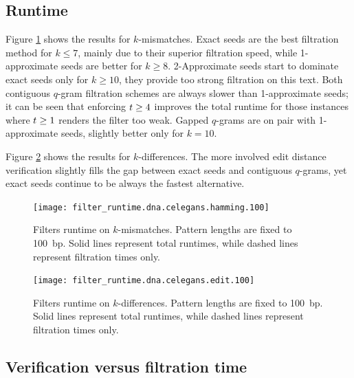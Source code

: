 \subsection{Runtime}

Figure \ref{fig:filter-runtime-hamming-celegans} shows the results for $k$-mismatches.
Exact seeds are the best filtration method for $k \leq 7$, mainly due to their superior filtration speed, while 1-approximate seeds are better for $k \geq 8$.
2-Approximate seeds start to dominate exact seeds only for $k \geq 10$, \ie they provide too strong filtration on this text.
Both contiguous $q$-gram filtration schemes are always slower than 1-approximate seeds;
it can be seen that enforcing $t \geq 4$ improves the total runtime for those instances where $t \geq 1$ renders the filter too weak.
Gapped $q$-grams are on pair with 1-approximate seeds, slightly better only for $k = 10$.

Figure \ref{fig:filter-runtime-edit-celegans} shows the results for $k$-differences.
The more involved edit distance verification slightly fills the gap between exact seeds and contiguous $q$-grams, yet exact seeds continue to be always the fastest alternative.

\begin{figure}[b]
\begin{center}
\caption[Filters runtime on $k$-mismatches]{Filters runtime on $k$-mismatches. Pattern lengths are fixed to 100~bp. Solid lines represent total runtimes, while dashed lines represent filtration times only.}
\label{fig:filter-runtime-hamming-celegans}
\texttt{[image: filter\_runtime.dna.celegans.hamming.100]}
\end{center}
\end{figure}

\begin{figure}[t]
\begin{center}
\caption[Filters runtime on $k$-differences]{Filters runtime on $k$-differences. Pattern lengths are fixed to 100~bp. Solid lines represent total runtimes, while dashed lines represent filtration times only.}
\label{fig:filter-runtime-edit-celegans}
\texttt{[image: filter\_runtime.dna.celegans.edit.100]}
\end{center}
\end{figure}

\subsection{Verification versus filtration time}

